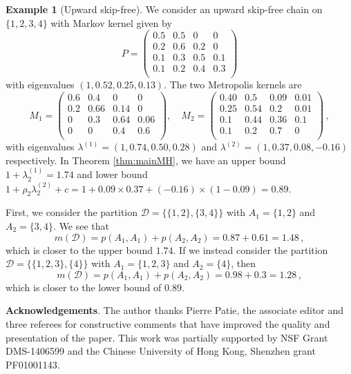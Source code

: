 \documentclass[12pt,a4]{amsart}
\numberwithin{equation}{section}
\theoremstyle{plain}
\theoremstyle{definition}
\newtheorem{example}{Example}[section]
\theoremstyle{remark}
\newcommand{\1}{\mathds{1}}
\begin{document}
\begin{example}[Upward skip-free]
	We consider an upward skip-free chain on $\{1,2,3,4\}$ with Markov kernel given by 
	\begin{equation*}\label{eq:example}
	P = \begin{pmatrix}
	0.5 & 0.5 & 0 & 0 \\
	0.2 & 0.6 & 0.2 & 0 \\
	0.1 & 0.3 & 0.5 & 0.1 \\
	0.1 & 0.2 & 0.4 & 0.3 \\
	\end{pmatrix}
	\end{equation*}
	with eigenvalues $(1,0.52,0.25,0.13)$. The two Metropolis kernels are
	\begin{equation*}\label{eq:example2}
	M_1 = \begin{pmatrix}
	0.6 & 0.4 & 0 & 0 \\
	0.2 & 0.66 & 0.14 & 0 \\
	0 & 0.3 & 0.64 & 0.06 \\
	0 & 0 & 0.4 & 0.6 \\
	\end{pmatrix}, \quad 
	M_2 = \begin{pmatrix}
	0.40 & 0.5 & 0.09 & 0.01 \\
	0.25 & 0.54 & 0.2 & 0.01 \\
	0.1 & 0.44 & 0.36 & 0.1 \\
	0.1 & 0.2 & 0.7 & 0 \\
	\end{pmatrix}\,,
	\end{equation*}
	with eigenvalues $\lambda^{(1)} = (1,0.74,0.50,0.28)$ and $\lambda^{(2)} = (1, 0.37, 0.08, -0.16)$ respectively.
	In Theorem \ref{thm:mainMH}, we have an upper bound $1 + \lambda_2^{(1)} = 1.74$ and lower bound $1 + \rho_2 \lambda_2^{(2)} + c = 1 + 0.09\times0.37 + (-0.16)\times (1-0.09) = 0.89$.
	
	First, we consider the partition $\mathcal{D} = \{\{1,2\},\{3,4\}\}$ with $A_1 = \{1,2\}$ and $A_2 = \{3,4\}$. We see that
	$$m(\mathcal{D}) = p(A_1,A_1) + p(A_2,A_2) = 0.87 + 0.61 = 1.48\,,$$
	which is closer to the upper bound $1.74$. If we instead consider the partition $\mathcal{D} = \{\{1,2,3\},\{4\}\}$ with $A_1 = \{1,2,3\}$ and $A_2 = \{4\}$, then 
	$$m(\mathcal{D}) = p(A_1,A_1) + p(A_2,A_2) = 0.98 + 0.3 = 1.28\,,$$
	which is closer to the lower bound of $0.89$.
\end{example}
\noindent \textbf{Acknowledgements}.
The author thanks Pierre Patie, the associate editor and three referees for constructive comments that have improved the quality and presentation of the paper. This work was partially supported by NSF Grant DMS-1406599 and the Chinese University of Hong Kong, Shenzhen grant PF01001143.



\end{document}
